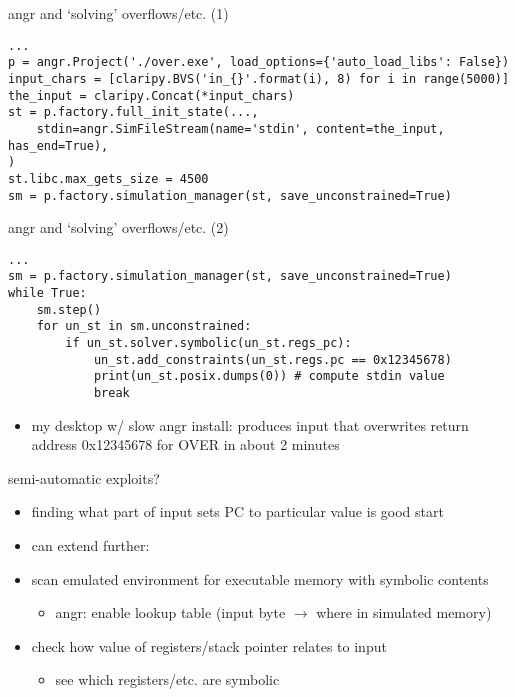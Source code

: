 \begin{frame}[fragile]{angr and `solving' overflows/etc. (1)}
\begin{Verbatim}[fontsize=\fontsize{9}{10}]
...
p = angr.Project('./over.exe', load_options={'auto_load_libs': False})
input_chars = [claripy.BVS('in_{}'.format(i), 8) for i in range(5000)]
the_input = claripy.Concat(*input_chars)
st = p.factory.full_init_state(...,
    stdin=angr.SimFileStream(name='stdin', content=the_input, has_end=True),
)
st.libc.max_gets_size = 4500
sm = p.factory.simulation_manager(st, save_unconstrained=True)
\end{Verbatim}
\end{frame}

\begin{frame}[fragile]{angr and `solving' overflows/etc. (2)}
\begin{Verbatim}[fontsize=\fontsize{9}{10}]
...
sm = p.factory.simulation_manager(st, save_unconstrained=True)
while True:
    sm.step()
    for un_st in sm.unconstrained:
        if un_st.solver.symbolic(un_st.regs_pc):
            un_st.add_constraints(un_st.regs.pc == 0x12345678)
            print(un_st.posix.dumps(0)) # compute stdin value
            break
\end{Verbatim}
\begin{itemize}
\item my desktop w/ slow angr install: produces input that overwrites return address 0x12345678 for OVER in about 2 minutes
\end{itemize}
\end{frame}

\begin{frame}{semi-automatic exploits?}
\begin{itemize}
\item finding what part of input sets PC to particular value is good start
\vspace{.5cm}
\item can extend further:
\item scan emulated environment for executable memory with symbolic contents
    \begin{itemize}
    \item angr: enable lookup table (input byte $\rightarrow$ where in simulated memory)
    \end{itemize}
\item check how value of registers/stack pointer relates to input
    \begin{itemize}
    \item see which registers/etc. are symbolic
    \end{itemize}
\end{itemize}
\end{frame}

